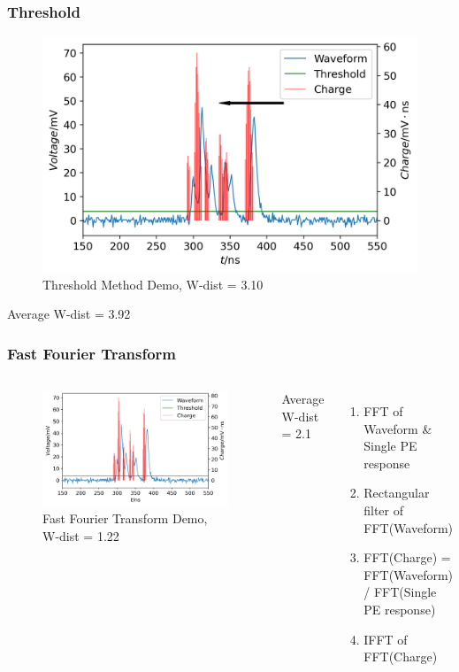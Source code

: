 \documentclass{beamer}
\begin{document}
\begin{frame}
\frametitle{Threshold}
\begin{figure}
    \centering
    \caption{Threshold Method Demo, W-dist = 3.10}
    \includegraphics[width=0.9\linewidth]{img/threshold.png}
\end{figure}
\vspace{-4mm}
\begin{center}
    Average W-dist = 3.92
\end{center}
\end{frame}

\begin{frame}
\frametitle{Fast Fourier Transform}
\begin{columns}
\begin{figure}
    \centering
    \caption{Fast Fourier Transform Demo, W-dist = 1.22}
    \includegraphics[width=1.0\linewidth]{img/fftrans.png}
\end{figure}
\vspace{-4mm}
\begin{center}
    Average W-dist = 2.1
\end{center}
\begin{enumerate}
    \item FFT of Waveform \& Single PE response
    \item Rectangular filter of FFT(Waveform)
    \item FFT(Charge) = FFT(Waveform) / FFT(Single PE response)
    \item IFFT of FFT(Charge)
\end{enumerate}
\end{columns}
\end{frame}
\end{document}
